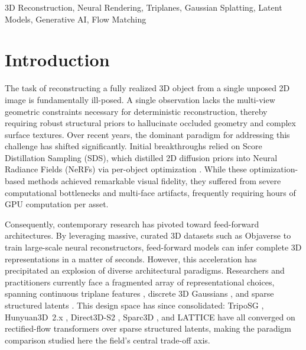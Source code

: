 \documentclass[10pt, conference]{IEEEtran}
\begin{document}
\begin{IEEEkeywords}
3D Reconstruction, Neural Rendering, Triplanes, Gaussian Splatting, Latent Models, Generative AI, Flow Matching
\end{IEEEkeywords}

\section{Introduction}

The task of reconstructing a fully realized 3D object from a single unposed 2D image is fundamentally ill-posed. A single observation lacks the multi-view geometric constraints necessary for deterministic reconstruction, thereby requiring robust structural priors to hallucinate occluded geometry and complex surface textures. Over recent years, the dominant paradigm for addressing this challenge has shifted significantly. Initial breakthroughs relied on Score Distillation Sampling (SDS), which distilled 2D diffusion priors into Neural Radiance Fields (NeRFs) via per-object optimization \cite{dreamfusion2022, magic3d2023}. While these optimization-based methods achieved remarkable visual fidelity, they suffered from severe computational bottlenecks and multi-face artifacts, frequently requiring hours of GPU computation per asset.

Consequently, contemporary research has pivoted toward feed-forward architectures. By leveraging massive, curated 3D datasets such as Objaverse \cite{objaverse} to train large-scale neural reconstructors, feed-forward models can infer complete 3D representations in a matter of seconds. However, this acceleration has precipitated an explosion of diverse architectural paradigms. Researchers and practitioners currently face a fragmented array of representational choices, spanning continuous triplane features \cite{lrm2024}, discrete 3D Gaussians \cite{splatterimage}, and sparse structured latents \cite{trellis2024}. This design space has since consolidated: TripoSG \cite{triposg2025}, Hunyuan3D~2.x \cite{hunyuan3d2_2025,hunyuan3d21_2025}, Direct3D-S2 \cite{direct3ds2_2025}, Sparc3D \cite{sparc3d2025}, and LATTICE \cite{lattice2025} have all converged on rectified-flow transformers over sparse structured latents, making the paradigm comparison studied here the field's central trade-off axis.
\end{document}
